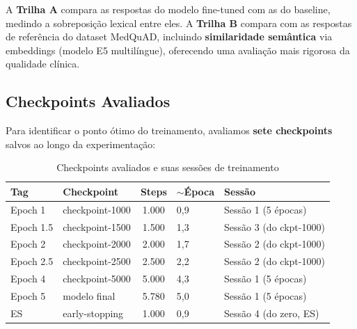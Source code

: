 A \textbf{Trilha A} compara as respostas do modelo fine-tuned com as do baseline, medindo a sobreposição lexical entre eles. A \textbf{Trilha B} compara com as respostas de referência do dataset MedQuAD, incluindo \textbf{similaridade semântica} via embeddings (modelo E5 multilíngue), oferecendo uma avaliação mais rigorosa da qualidade clínica.

\subsection{Checkpoints Avaliados}

Para identificar o ponto ótimo do treinamento, avaliamos \textbf{sete checkpoints} salvos ao longo da experimentação:

\begin{table}[H]
\centering
\caption{Checkpoints avaliados e suas sessões de treinamento}
\label{tab:checkpoints}
\begin{tabular}{llcll}
\toprule
\textbf{Tag} & \textbf{Checkpoint} & \textbf{Steps} & \textbf{$\sim$Época} & \textbf{Sessão} \\
\midrule
Epoch 1    & checkpoint-1000  & 1.000 & 0,9 & Sessão 1 (5 épocas) \\
Epoch 1.5  & checkpoint-1500  & 1.500 & 1,3 & Sessão 3 (do ckpt-1000) \\
Epoch 2    & checkpoint-2000  & 2.000 & 1,7 & Sessão 2 (do ckpt-1000) \\
Epoch 2.5  & checkpoint-2500  & 2.500 & 2,2 & Sessão 2 (do ckpt-1000) \\
Epoch 4    & checkpoint-5000  & 5.000 & 4,3 & Sessão 1 (5 épocas) \\
Epoch 5    & modelo final     & 5.780 & 5,0 & Sessão 1 (5 épocas) \\
ES         & early-stopping   & 1.000 & 0,9 & Sessão 4 (do zero, ES) \\
\bottomrule
\end{tabular}
\end{table}

